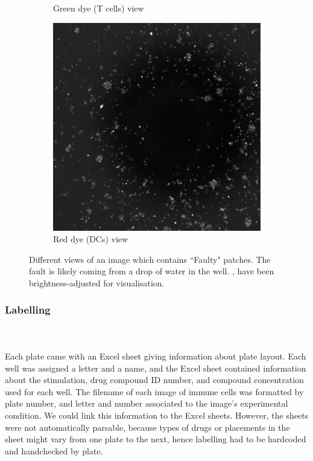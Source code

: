 \begin{figure}[h!]
\begin{subfigure}[h!]{0.3\textwidth}
        \caption{Green dye (T cells) view}
        \label{subfig:tcell}
    \end{subfigure}
    \begin{subfigure}[h!]{0.3\textwidth}
        \includegraphics[width=\textwidth]{dissertation/figures/faulty_dcell.jpg}
        \caption{Red dye (DCs) view}
        \label{subfig:dc}
    \end{subfigure}
    \caption{Different views of an image which contains ``Faulty" patches. The fault is likely coming from a drop of water in the well. \protect{}, \protect{} have been brightness-adjusted for visualisation.}
    \label{fig:noisyimage}
\end{figure}

\bigskip
\subsubsection{Labelling}

\hfill\\
\hfill\\
Each plate came with an Excel sheet giving information about plate layout. Each well was assigned a letter and a name, and the Excel sheet contained information about the stimulation, drug compound ID number, and compound concentration used for each well. The filename of each image of immune cells was formatted by plate number, and letter and number associated to the image's experimental condition. We could link this information to the Excel sheets. However, the sheets were not automatically parsable, because types of drugs or placements in the sheet might vary from one plate to the next, hence labelling had to be hardcoded and handchecked by plate. 

